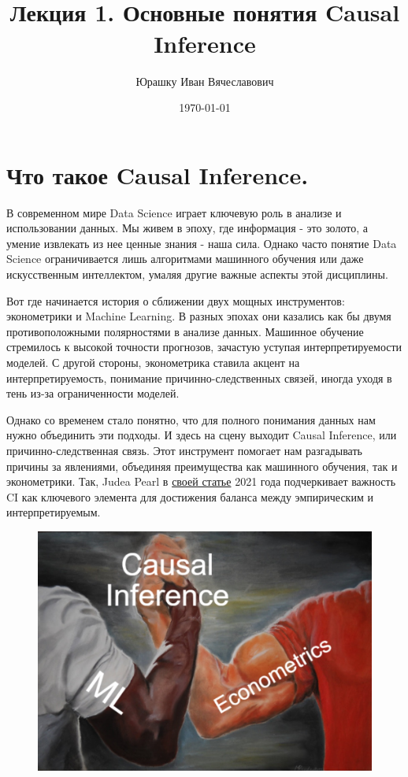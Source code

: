 \documentclass{article}
\title{
    \textbf{\coursename}\\
    Лекция 1.
    Основные понятия Causal Inference
    }
\author{Юрашку Иван Вячеславович}
\date{\today}
\begin{document}

    \maketitle

    \section*{Что такое Causal Inference.}

        В современном мире Data Science играет ключевую роль в анализе и использовании данных. Мы живем в эпоху, где информация - это золото, а умение извлекать из нее ценные знания - наша сила. Однако часто понятие Data Science ограничивается лишь алгоритмами машинного обучения или даже искусственным интеллектом, умаляя другие важные аспекты этой дисциплины.

        Вот где начинается история о сближении двух мощных инструментов: эконометрики и Machine Learning. В разных эпохах они казались как бы двумя противоположными полярностями в анализе данных. Машинное обучение стремилось к высокой точности прогнозов, зачастую уступая интерпретируемости моделей. С другой стороны, эконометрика ставила акцент на интерпретируемость, понимание причинно-следственных связей, иногда уходя в тень из-за ограниченности моделей.

        Однако со временем стало понятно, что для полного понимания данных нам нужно объединить эти подходы. И здесь на сцену выходит Causal Inference, или причинно-следственная связь. Этот инструмент помогает нам разгадывать причины за явлениями, объединяя преимущества как машинного обучения, так и эконометрики. Так, Judea Pearl в \href{https://www.degruyter.com/document/doi/10.1515/jci-2021-0006/html}{своей статье} 2021 года подчеркивает важность CI как ключевого элемента для достижения баланса между эмпирическим и интерпретируемым.

        \begin{figure}[h]
            \centering
            \includegraphics[width=0.7\linewidth]{imgs/epic_CI.jpg}
            \label{fig:mpr}
        \end{figure}
\end{document}
